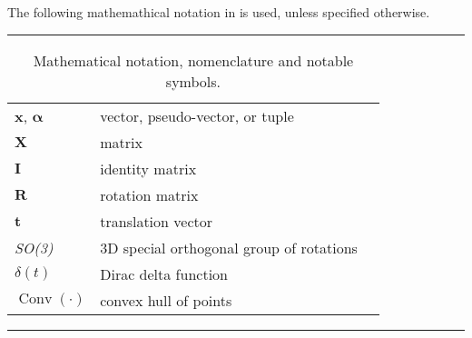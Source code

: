 The following mathemathical notation in  is used, unless specified otherwise.

\begin{table*}[!h]
  \scriptsize
  \centering
  \noindent\rule{\textwidth}{0.5pt}
  \begin{tabular}{lll}
    $\mathbf{x}$, $\bm{\alpha}$ & vector, pseudo-vector, or tuple\\
    $\mathbf{X}$ & matrix \\
    $\mathbf{I}$ & identity matrix \\
    $\mathbf{R}$ & rotation matrix \\
    $\mathbf{t}$ & translation vector \\
    \emph{SO(3)} & 3D special orthogonal group of rotations\\
    $\delta(t)$ & Dirac delta function \\
    $\operatorname{Conv}(\cdot)$ & convex hull of points \\
  \end{tabular}
  \noindent\rule{\textwidth}{0.5pt}
  \caption{Mathematical notation, nomenclature and notable symbols.}
  \label{tab:mathematical_notation}
\end{table*}

